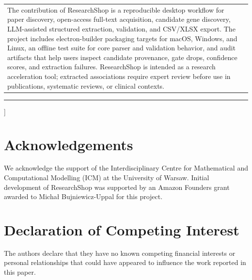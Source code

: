 \documentclass[final,5p,times,twocolumn]{elsarticle}
\begin{document}
\begin{@twocolumnfalse}
{\begin{tabularx}{\textwidth}{>{\raggedright\arraybackslash}p{} >{\raggedright\arraybackslash}X}
The contribution of ResearchShop is a reproducible desktop workflow for paper discovery, open-access full-text acquisition, candidate gene discovery, LLM-assisted structured extraction, validation, and CSV/XLSX export. The project includes electron-builder packaging targets for macOS, Windows, and Linux, an offline test suite for core parser and validation behavior, and audit artifacts that help users inspect candidate provenance, gate drops, confidence scores, and extraction failures. ResearchShop is intended as a research acceleration tool; extracted associations require expert review before use in publications, systematic reviews, or clinical contexts.
\end{tabularx}
}
\vspace{0.75em}
\hrule
\vspace{0.95em}

\vspace{1.0em}
\vspace{1.2em}
\end{@twocolumnfalse}
]
\makeatother





\section*{Acknowledgements}
We acknowledge the support of the Interdisciplinary Centre for Mathematical and Computational Modelling (ICM) at the University of Warsaw. Initial development of ResearchShop was supported by an
Amazon Founders grant awarded to Micha{\l} Bujniewicz-Uppal for this project.

\section*{Declaration of Competing Interest}
The authors declare that they have no known competing financial interests or personal relationships that could have appeared to influence the work reported in this paper.

\begingroup
\footnotesize
\setlength{\bibsep}{0pt}

\endgroup
\end{document}
